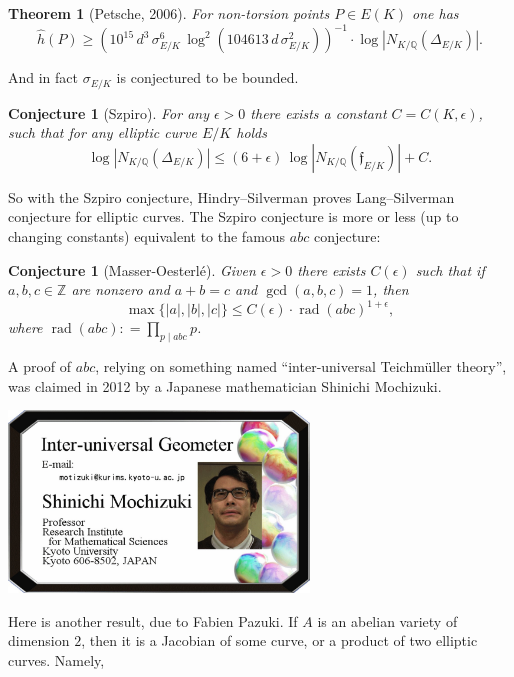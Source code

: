 \documentclass{article}
\newtheorem{conjecture}[proposition]{Conjecture}
\newtheorem{theorem}[proposition]{Theorem}
\theoremstyle{definition}
\DeclareMathOperator{\rad}{rad}
\newcommand{\dfn}{\mathrel{\mathop:}=}
\newcommand{\QQ}{\mathbb{Q}}
\begin{document}
\begin{theorem}[Petsche, 2006]
  For non-torsion points $P\in E (K)$ one has
  $$\widehat{h} (P) \ge (10^{15} \, d^3 \, \sigma_{E/K}^6 \, \log^2 (104613\,d\,\sigma_{E/K}^2))^{-1} \cdot \log |N_{K/\QQ} (\Delta_{E/K})|.$$
\end{theorem}

And in fact $\sigma_{E/K}$ is conjectured to be bounded.

\begin{conjecture}[Szpiro]
  For any $\epsilon > 0$ there exists a constant $C = C (K,\epsilon)$, such that
  for any elliptic curve $E/K$ holds
  $$\log |N_{K/\QQ} (\Delta_{E/K})| \le (6+\epsilon) \, \log |N_{K/\QQ} (\mathfrak{f}_{E/K})| + C.$$
\end{conjecture}

So with the Szpiro conjecture, Hindry--Silverman proves Lang--Silverman
conjecture for elliptic curves. The Szpiro conjecture is more or less
(up to changing constants) equivalent to the famous $abc$ conjecture:

\begin{conjecture}[Masser-Oesterl\'e]
  Given $\epsilon > 0$ there exists $C (\epsilon)$ such that if
  $a,b,c\in\mathbb{Z}$ are nonzero and $a+b=c$ and $\gcd(a,b,c)=1$, then
  $$\max \{ | a|,|b|,|c| \} \leq C(\epsilon)\cdot \rad(abc)^{1+\epsilon},$$
  where $\displaystyle \rad(abc) \dfn \prod_{p\mid abc} p$.
\end{conjecture}

A proof of $abc$, relying on something named ``inter-universal Teichm\"uller
theory'', was claimed in 2012 by a Japanese mathematician Shinichi Mochizuki.

\begin{center}
  \includegraphics[width=8cm]{mochizuki.jpg}
\end{center}

Here is another result, due to Fabien Pazuki. If $A$ is an abelian variety of
dimension $2$, then it is a Jacobian of some curve, or a product of two elliptic
curves. Namely,
\end{document}
